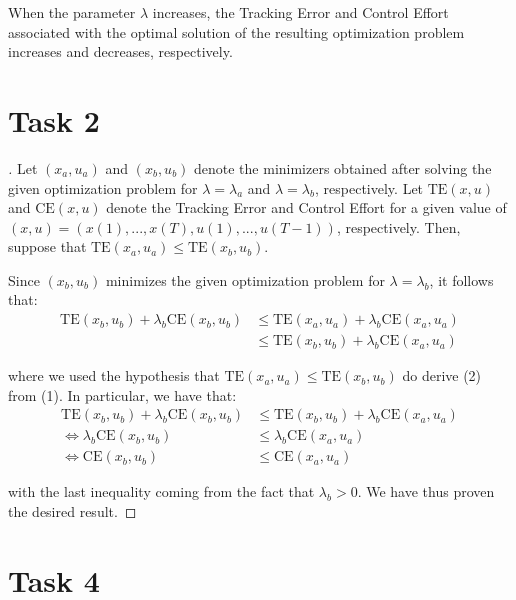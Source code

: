 \documentclass[12pt]{article}
\begin{document}
When the parameter $\lambda$ increases, the Tracking Error and Control Effort associated with the optimal solution of the resulting optimization problem increases and decreases, respectively. \\

\section{Task 2}

\begin{proof}[\unskip\nopunct]
    Let $(x_a, u_a)$ and $(x_b, u_b)$ denote the minimizers obtained after solving the given optimization problem for $\lambda = \lambda_{a}$ and $\lambda = \lambda_{b}$, respectively. Let $\text{TE}(x, u)$ and $\text{CE}(x, u)$ denote the Tracking Error and Control Effort for a given value of $(x, u) = (x(1), ..., x(T), u(1), ..., u(T - 1))$, respectively.
    Then, suppose that $\text{TE}(x_a, u_a) \le \text{TE}(x_b, u_b)$.

    Since $(x_b, u_b)$ minimizes the given optimization problem for $\lambda = \lambda_b$, it follows that:
    \vspace{-0.3em}
    \begin{align}
        \text{TE}(x_b, u_b) + \lambda_b \text{CE}(x_b, u_b) & \le 
        \text{TE}(x_a, u_a) + \lambda_b \text{CE}(x_a, u_a) \\
        & \le \text{TE}(x_b, u_b) + \lambda_b \text{CE}(x_a, u_a)
    \end{align}

    where we used the hypothesis that $\text{TE}(x_a, u_a) \le \text{TE}(x_b, u_b)$ do derive (2) from (1). In particular, we have that:
    \vspace{-0.3em}
    \begin{align*}
        \text{TE}(x_b, u_b) + \lambda_b \text{CE}(x_b, u_b) & \le 
        \text{TE}(x_b, u_b) + \lambda_b \text{CE}(x_a, u_a) \\
        \Leftrightarrow \lambda_b \text{CE}(x_b, u_b) & \le 
        \lambda_b \text{CE}(x_a, u_a) \\
        \Leftrightarrow \text{CE}(x_b, u_b) &\le \text{CE}(x_a, u_a)
    \end{align*}

    with the last inequality coming from the fact that $\lambda_b > 0$. We have thus proven the desired result.
\end{proof}

\section{Task 4}
\end{document}
